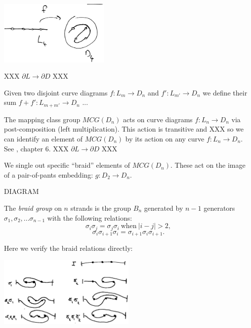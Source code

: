 \documentclass[11pt,a4paper]{article}
\begin{document}
\begin{center}
\includegraphics[width=0.4\textwidth]{curve-diagram.eps}
\end{center}

XXX $\partial L\to \partial D$ XXX

Given two disjoint curve diagrams $f:L_m\to D_n$ and $f':L_{m'}\to D_n$
we define their sum  $f+f':L_{m+m'}\to D_n$ ...



The mapping class group $MCG(D_n)$ acts on curve diagrams $f : L_n\to D_n$
via post-composition (left multiplication).
This action is transitive and XXX so we can identify an element of
$MCG(D_n)$ by its action on any curve $f:L_n\to D_n.$
See \cite{Dehornoy02}, chapter 6.
XXX $\partial L\to \partial D$ XXX



We single out specific ``braid'' elements of $MCG(D_n)$.
These act on the image of a pair-of-pants embedding: $g:D_2\to D_n.$

DIAGRAM

The {\it braid group} on $n$ strands is the group $B_n$ generated by $n-1$ generators
$\sigma_1, \sigma_2, ... \sigma_{n-1}$ with the following relations:
    $$ \sigma_i \sigma_j = \sigma_j \sigma_i \ \text{when}\ |i-j| > 2, $$
    $$ \sigma_i \sigma_{i+1} \sigma_i =  \sigma_{i+1} \sigma_i \sigma_{i+1}.$$


Here we verify the braid relations directly:

\begin{center}
\includegraphics[width=0.5\textwidth]{curve-braid.eps}
\end{center}
\end{document}
